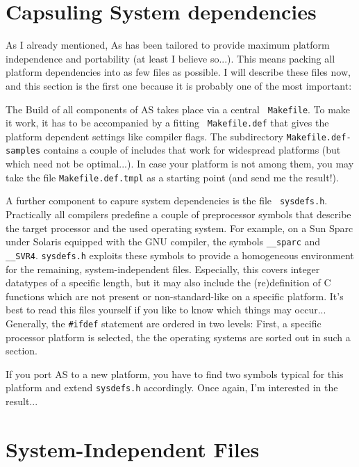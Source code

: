 \documentclass[12pt,twoside]{report}
\newcommand{\asname}{{AS}}
\begin{document}

\section{Capsuling System dependencies}

As I already mentioned, As has been tailored to provide maximum platform
independence and portability (at least I believe so...).  This means
packing all platform dependencies into as few files as possible.  I will
describe these files now, and this section is the first one because it is
probably one of the most important:

The Build of all components of \asname{} takes place via a central {\tt
Makefile}.  To make it work, it has to be accompanied by a fitting {\tt
Makefile.def} that gives the platform dependent settings like compiler
flags.  The subdirectory {\tt Makefile.def-samples} contains a couple of
includes that work for widespread platforms (but which need not be
optimal...).  In case your platform is not among them, you may take the
file {\tt Makefile.def.tmpl} as a starting point (and send me the
result!).

A further component to capure system dependencies is the file {\tt
sysdefs.h}.  Practically all compilers predefine a couple of preprocessor
symbols that describe the target processor and the used operating system.
For example, on a Sun Sparc under Solaris equipped with the GNU compiler,
the symbols \verb!__sparc! and \verb!__SVR4!.  {\tt sysdefs.h} exploits
these symbols to provide a homogeneous environment for the remaining,
system-independent files.  Especially, this covers integer datatypes of a
specific length, but it may also include the (re)definition of C functions
which are not present or non-standard-like on a specific platform.  It's
best to read this files yourself if you like to know which things may
occur...  Generally, the \verb!#ifdef! statement are ordered in two
levels: First, a specific processor platform is selected, the the
operating systems are sorted out in such a section.

If you port \asname{} to a new platform, you have to find two symbols typical for
this platform and extend {\tt sysdefs.h} accordingly.  Once again, I'm
interested in the result...


\section{System-Independent Files}
\end{document}

